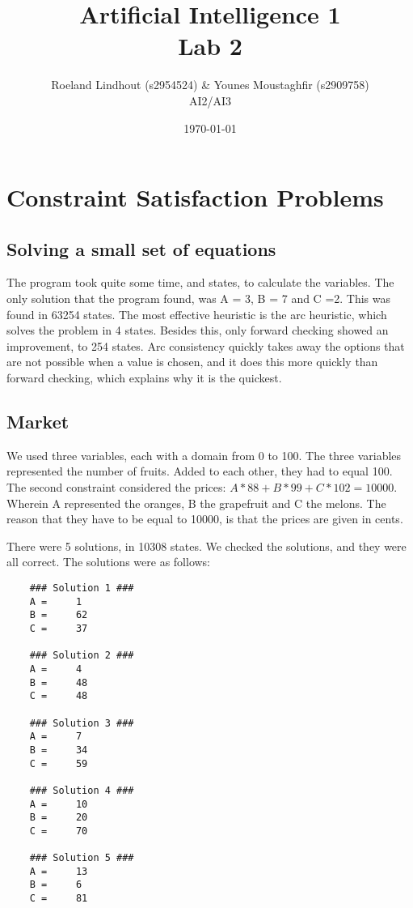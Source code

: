 \documentclass{article}
\title{Artificial Intelligence 1 \\ Lab 2}%
\author{Roeland Lindhout (s2954524) \& Younes Moustaghfir (s2909758) \\ AI2/AI3} %
\date{\today}%
\begin{document}
	
	\maketitle
	
	\section{Constraint Satisfaction Problems}
	
		
	\subsection*{Solving a small set of equations}
	
	The program took quite some time, and states, to calculate the variables. The only solution that the program found, was A = 3, B = 7 and C =2. This was found in 63254 states.
	The most effective heuristic is the arc heuristic, which solves the problem in 4 states. Besides this, only forward checking showed an improvement, to 254 states. Arc consistency quickly takes away the options that are not possible when a value is chosen, and it does this more quickly than forward checking, which explains why it is the quickest.
	
	\subsection*{Market}
	
	We used three variables, each with a domain from 0 to 100. The three variables represented the number of fruits. Added to each other, they had to equal 100. The second constraint considered the prices: $A*88 + B*99 + C*102 = 10000$. Wherein A represented the oranges, B the grapefruit and C the melons. The reason that they have to be equal to 10000, is that the prices are given in cents. 
	
	There were 5 solutions, in 10308 states. We checked the solutions, and they were all correct. The solutions were as follows: 
	\begin{lstlisting}	
	### Solution 1 ###
	A = 	1 
	B = 	62 
	C = 	37 

	### Solution 2 ###
	A = 	4 
	B = 	48 
	C = 	48 

	### Solution 3 ###
	A = 	7 
	B = 	34 
	C = 	59 

	### Solution 4 ###
	A = 	10 
	B = 	20 
	C = 	70 

	### Solution 5 ###
	A = 	13 
	B = 	6 
	C = 	81 
	\end{lstlisting}
	
\end{document}

